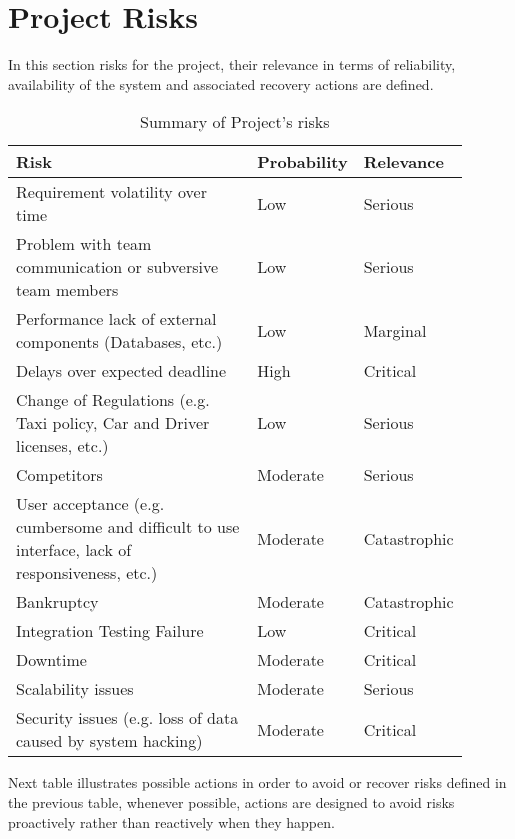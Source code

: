 \newpage
\section{Project Risks}
In this section risks for the project, their relevance in terms of reliability, availability of the system and associated recovery actions are defined.
\begin{table}[H]
	\centering
	\begin{tabular}{p{0.6\linewidth}x{0.15\linewidth}x{0.15\linewidth}}
	\hline
	\textbf{Risk} & \textbf{Probability} & \textbf{Relevance} \\
	\hline
	Requirement volatility over time & Low & Serious \\
	Problem with team communication or subversive team members & Low & Serious \\
	Performance lack of external components (Databases, etc.) & Low & Marginal \\
	Delays over expected deadline & High & Critical \\ 
	Change of Regulations (e.g. Taxi policy, Car and Driver licenses, etc.) & Low & Serious \\
	Competitors & Moderate & Serious \\
	User acceptance (e.g. cumbersome and difficult to use interface, lack of responsiveness, etc.) & Moderate & Catastrophic \\
	Bankruptcy & Moderate & Catastrophic \\
	Integration Testing Failure & Low & Critical \\
	Downtime & Moderate & Critical \\
	Scalability issues & Moderate & Serious \\
	Security issues (e.g. loss of data caused by system hacking) & Moderate & Critical \\
	\hline
	\end{tabular}
	\caption{Summary of Project's risks}
\end{table} 
Next table illustrates possible actions in order to avoid or recover risks defined in the previous table, whenever possible, actions are designed to avoid risks proactively rather than reactively when they happen.
